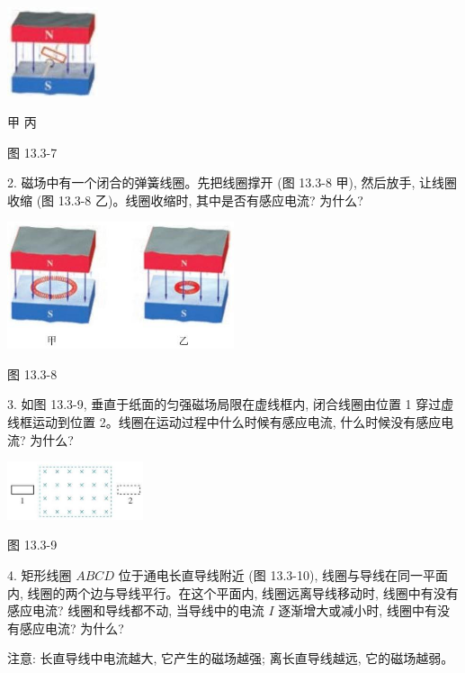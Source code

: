 \documentclass[10pt]{article}
\begin{document}
\begin{center}
\includegraphics[max width=0.2\textwidth]{images/01911d5f-8e38-70c0-b5b8-2b399bd115b6_122_765187.jpg}
\end{center}

甲 丙

图 13.3-7

2. 磁场中有一个闭合的弹簧线圈。先把线圈撑开 (图 13.3-8 甲), 然后放手, 让线圈收缩 (图 13.3-8 乙)。线圈收缩时, 其中是否有感应电流? 为什么?

\begin{center}
\includegraphics[max width=0.5\textwidth]{images/01911d5f-8e38-70c0-b5b8-2b399bd115b6_123_395934.jpg}
\end{center}

图 13.3-8

3. 如图 13.3-9, 垂直于纸面的匀强磁场局限在虚线框内, 闭合线圈由位置 1 穿过虚线框运动到位置 2。线圈在运动过程中什么时候有感应电流, 什么时候没有感应电流? 为什么?

\begin{center}
\includegraphics[max width=0.3\textwidth]{images/01911d5f-8e38-70c0-b5b8-2b399bd115b6_123_409288.jpg}
\end{center}

图 13.3-9

4. 矩形线圈 \({ABCD}\) 位于通电长直导线附近 (图 13.3-10), 线圈与导线在同一平面内, 线圈的两个边与导线平行。在这个平面内, 线圈远离导线移动时, 线圈中有没有感应电流? 线圈和导线都不动, 当导线中的电流 \(I\) 逐渐增大或减小时, 线圈中有没有感应电流? 为什么?

注意: 长直导线中电流越大, 它产生的磁场越强; 离长直导线越远, 它的磁场越弱。
\end{document}
